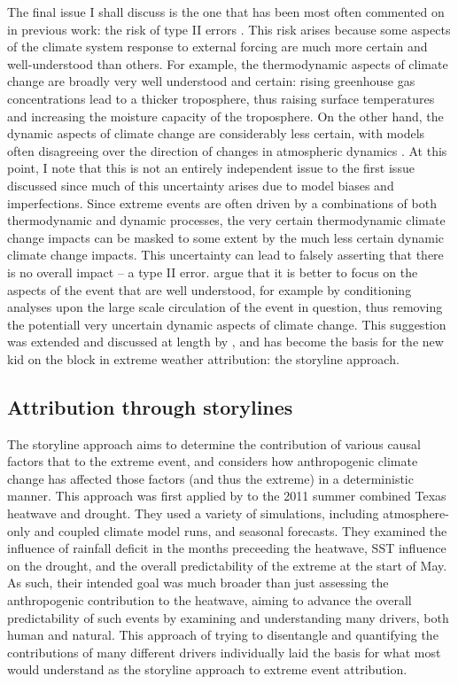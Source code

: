     The final issue I shall discuss is the one that has been most often commented on in previous work: the risk of type II errors \citep{shepherd_common_2016,trenberth_attribution_2015}. This risk arises because some aspects of the climate system response to external forcing are much more certain and well-understood than others. For example, the thermodynamic aspects of climate change are broadly very well understood and certain: rising greenhouse gas concentrations lead to a thicker troposphere, thus raising surface temperatures and increasing the moisture capacity of the troposphere. On the other hand, the dynamic aspects of climate change are considerably less certain, with models often disagreeing over the direction of changes in atmospheric dynamics \citep{masato_winter_2013}. At this point, I note that this is not an entirely independent issue to the first issue discussed since much of this uncertainty arises due to model biases and imperfections. Since extreme events are often driven by a combinations of both thermodynamic and dynamic processes, the very certain thermodynamic climate change impacts can be masked to some extent by the much less certain dynamic climate change impacts. This uncertainty can lead to falsely asserting that there is no overall impact -- a type II error. \citet{trenberth_attribution_2015} argue that it is better to focus on the aspects of the event that are well understood, for example by conditioning analyses upon the large scale circulation of the event in question, thus removing the potentiall very uncertain dynamic aspects of climate change. This suggestion was extended and discussed at length by \citet{shepherd_common_2016}, and has become the basis for the new kid on the block in extreme weather attribution: the storyline approach.

  \subsection{Attribution through storylines}

    The storyline approach \citep[or `Boulder' approach,][]{otto_attribution_2017} aims to determine the contribution of various causal factors that to the extreme event, and considers how anthropogenic climate change has affected those factors (and thus the extreme) in a deterministic manner. This approach was first applied by \citet{hoerling_anatomy_2013} to the 2011 summer combined Texas heatwave and drought. They used a variety of simulations, including atmosphere-only and coupled climate model runs, and seasonal forecasts. They examined the influence of rainfall deficit in the months preceeding the heatwave, SST influence on the drought, and the overall predictability of the extreme at the start of May. As such, their intended goal was much broader than just assessing the anthropogenic contribution to the heatwave, aiming to advance the overall predictability of such events by examining and understanding many drivers, both human and natural. This approach of trying to disentangle and quantifying the contributions of many different drivers individually laid the basis for what most would understand as the storyline approach to extreme event attribution.

